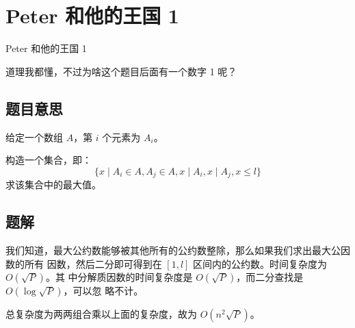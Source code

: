 \def\sectionName{Peter 和他的王国 1}
\section[\TOCName]{\sectionName}



\begin{frame}

\isBeamerMode\relax
    {\Huge \sectionName}\par
\fi




道理我都懂，不过为啥这个题目后面有一个数字 1 呢？



\end{frame}

\subsection{题目意思}
\begin{frame} %
给定一个数组 $A$，第 $i$ 个元素为 $A_i$。

构造一个集合，即：\[\{x \mid A_i \in A, A_j \in A, x \mid A_i, x \mid A_j, x \le
l\}\]求该集合中的最大值。
\end{frame}



\subsection{题解}
\begin{frame} %
我们知道，最大公约数能够被其他所有的公约数整除，那么如果我们求出最大公因数的所有
因数，然后二分即可得到在 $[1, l]$ 区间内的公约数。时间复杂度为 $O(\sqrt P)$。其
中分解质因数的时间复杂度是 $O(\sqrt P)$，而二分查找是 $O(\log \sqrt P)$，可以忽
略不计。

总复杂度为两两组合乘以上面的复杂度，故为 $O(n^2 \sqrt P)$。
\end{frame}
